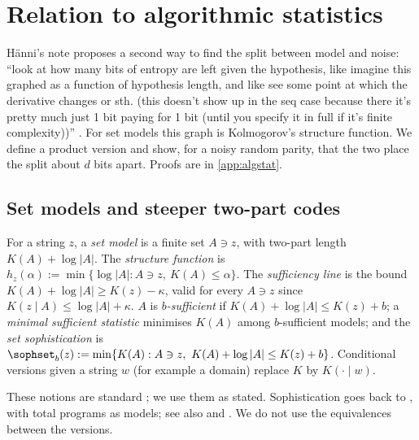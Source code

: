 \section{Relation to algorithmic statistics}\label{sec:algstat}

H\"anni's note proposes a second way to find the split between model and noise: ``look at how many bits of entropy are left given the hypothesis, like imagine this graphed as a function of hypothesis length, and like see some point at which the derivative changes or sth. (this doesn't show up in the seq case because there it's pretty much just 1 bit paying for 1 bit (until you specify it in full if it's finite complexity))'' \citep{hanni2026notes}. For set models this graph is Kolmogorov's structure function. We define a product version and show, for a noisy random parity, that the two place the split about $d$ bits apart. Proofs are in \cref{app:algstat}.

\subsection{Set models and steeper two-part codes}\label{sec:algstat:set}

\begin{definition}\label{def:algstat:set}
For a string $z$, a \emph{set model} is a finite set $A\ni z$, with two-part length $K(A)+\log|A|$. The \emph{structure function} is $h_z(\alpha):=\min\{\log|A|:A\ni z,\ K(A)\le\alpha\}$. The \emph{sufficiency line} is the bound $K(A)+\log|A|\ge K(z)-\kappa$, valid for every $A\ni z$ since $K(z\mid A)\le\log|A|+\kappa$. $A$ is \emph{$b$-sufficient} if $K(A)+\log|A|\le K(z)+b$; a \emph{minimal sufficient statistic} minimises $K(A)$ among $b$-sufficient models; and the \emph{set sophistication} is $\sophset_b(z):=\min\{K(A):A\ni z,\ K(A)+\log|A|\le K(z)+b\}$. Conditional versions given a string $w$ (for example a domain) replace $K$ by $K(\cdot\mid w)$.
\end{definition}

These notions are standard \citep{gacs2001algorithmic,vereshchagin2004kolmogorov,vereshchagin2017algorithmic}; we use them as stated. Sophistication goes back to \citet{koppel1987complexity,koppel1991almost}, with total programs as models; see also \citet{vitanyi2006meaningful} and \citet{antunes2009sophistication}. We do not use the equivalences between the versions.

